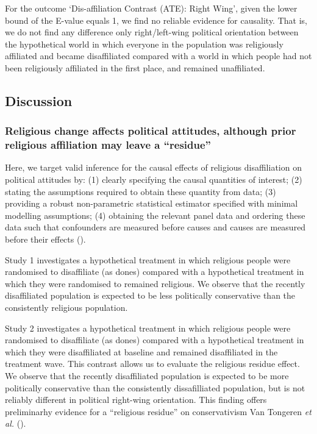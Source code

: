 \documentclass[
  singlecolumn]{article}
\begin{document}
For the outcome `Dis-affiliation Contrast (ATE): Right Wing', given the
lower bound of the E-value equals 1, we find no reliable evidence for
causality. That is, we do not find any difference only right/left-wing
political orientation between the hypothetical world in which everyone
in the population was religiously affiliated and became disaffiliated
compared with a world in which people had not been religiously
affiliated in the first place, and remained unaffiliated.

\subsection{Discussion}\label{discussion}

\subsubsection{Religious change affects political attitudes, although
prior religious affiliation may leave a
``residue''}\label{religious-change-affects-political-attitudes-although-prior-religious-affiliation-may-leave-a-residue}

Here, we target valid inference for the causal effects of religious
disaffiliation on political attitudes by: (1) clearly specifying the
causal quantities of interest; (2) stating the assumptions required to
obtain these quantity from data; (3) providing a robust non-parametric
statistical estimator specified with minimal modelling assumptions; (4)
obtaining the relevant panel data and ordering these data such that
confounders are measured before causes and causes are measured before
their effects ().

Study 1 investigates a hypothetical treatment in which religious people
were randomised to disaffiliate (as dones) compared with a hypothetical
treatment in which they were randomised to remained religious. We
observe that the recently disaffiliated population is expected to be
less politically conservative than the consistently religious
population.

Study 2 investigates a hypothetical treatment in which religious people
were randomised to disaffiliate (as dones) compared with a hypothetical
treatment in which they were disaffiliated at baseline and remained
disaffiliated in the treatment wave. This contrast allows us to evaluate
the religious residue effect. We observe that the recently disaffiliated
population is expected to be more politically conservative than the
consistently dissafilliated population, but is not reliably different in
political right-wing orientation. This finding offers preliminarhy
evidence for a ``religious residue'' on conservativism Van Tongeren
\emph{et al.} ().
\end{document}
